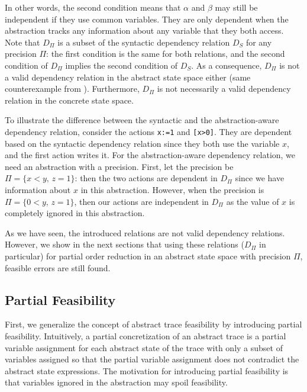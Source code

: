 \documentclass[numbook]{svjour3}
\begin{document}
In other words, the second condition means that $\alpha$ and $\beta$ may still be independent if they use common variables. They are only dependent when the abstraction tracks any information about any variable that they both access. Note that $D_\Pi$ is a subset of the syntactic dependency relation $D_S$ for any precision $\Pi$: the first condition is the same for both relations, and the second condition of $D_\Pi$ implies the second condition of $D_S$. As a consequence, $D_\Pi$ is not a valid dependency relation in the abstract state space either (same counterexample from ). Furthermore, $D_\Pi$ is not necessarily a valid dependency relation in the concrete state space.

\begin{example}
	To illustrate the difference between the syntactic and the abstraction-aware dependency relation, consider the actions \texttt{x:=1} and \texttt{[x>0]}. They are dependent based on the syntactic dependency relation since they both use the variable $x$, and the first action writes it. For the abstraction-aware dependency relation, we need an abstraction with a precision. First, let the precision be $\Pi = \{x < y\text{, }z = 1\}$: then the two actions are dependent in $D_\Pi$ since we have information about $x$ in this abstraction. However, when the precision is $\Pi = \{0 < y\text{, }z = 1\}$, then our actions are independent in $D_\Pi$ as the value of $x$ is completely ignored in this abstraction.
\end{example}

As we have seen, the introduced relations are not valid dependency relations. However, we show in the next sections that using these relations ($D_\Pi$ in particular) for partial order reduction in an abstract state space with precision $\Pi$, feasible errors are still found.

\subsection{Partial Feasibility}

First, we generalize the concept of abstract trace feasibility by introducing partial feasibility. Intuitively, a partial concretization of an abstract trace is a partial variable assignment for each abstract state of the trace with only a subset of variables assigned so that the partial variable assignment does not contradict the abstract state expressions. The motivation for introducing partial feasibility is that variables ignored in the abstraction may spoil feasibility.
\end{document}
